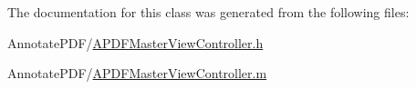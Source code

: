 The documentation for this class was generated from the following files\-:\begin{DoxyCompactItemize}
\item 
Annotate\-P\-D\-F/\hyperlink{_a_p_d_f_master_view_controller_8h}{A\-P\-D\-F\-Master\-View\-Controller.\-h}\item 
Annotate\-P\-D\-F/\hyperlink{_a_p_d_f_master_view_controller_8m}{A\-P\-D\-F\-Master\-View\-Controller.\-m}\end{DoxyCompactItemize}
